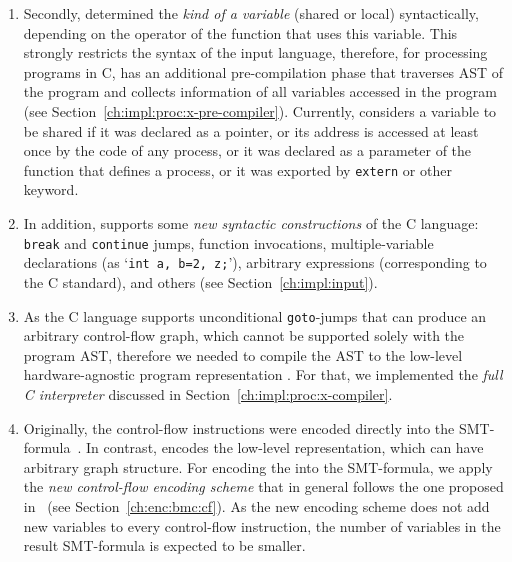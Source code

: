 \begin{enumerate}[label=\arabic*.]
\begin{enumerate}[leftmargin=\parindent,label=\alph*.]
  \item Secondly, \porthos[1] determined the \textit{kind of a variable} (shared or local) syntactically, depending on the operator of the function that uses this variable.
  This strongly restricts the syntax of the input language, therefore, for processing programs in C, \porthos[2] has an additional pre-compilation phase that traverses AST of the program and collects information of all variables accessed in the program (see Section~\ref{ch:impl:proc:x-pre-compiler}).
  Currently, \porthos[2] considers a variable to be shared if it was declared as a pointer, or its address is accessed at least once by the code of any process, or it was declared as a parameter of the function that defines a process, or it was exported by \texttt{extern} or other keyword.
  
  \item In addition, \porthos[2] supports some \textit{new syntactic constructions} of the C language: \texttt{break} and \texttt{continue} jumps, function invocations, multiple-variable declarations (as `\lstinline{int a, b=2, z;}'), arbitrary expressions (corresponding to the C standard), and others (see Section~\ref{ch:impl:input}).

  \item As the C language supports unconditional \texttt{goto}-jumps that can produce an arbitrary control-flow graph, which cannot be supported solely with the program AST, therefore we needed to compile the AST to the low-level hardware-agnostic program representation \xgraph{}.
  For that, we implemented the \textit{full C interpreter} discussed in Section~\ref{ch:impl:proc:x-compiler}.
  
  \item Originally, the control-flow instructions were encoded directly into the SMT-formula~\cite{Porthos17a}.
  In contrast, \porthos[2] encodes the low-level \xgraph{} representation, which can have arbitrary graph structure.
  For encoding the \xgraph{} into the SMT-formula, we apply the \textit{new control-flow encoding scheme} that in general follows the one proposed in~\cite[Chapter 5.1.2]{heljanko2008unfoldings} (see Section~\ref{ch:enc:bmc:cf}).
  As the new encoding scheme does not add new variables to every control-flow instruction, the number of variables in the result SMT-formula is expected to be smaller.
  

\end{enumerate}
\end{enumerate}

